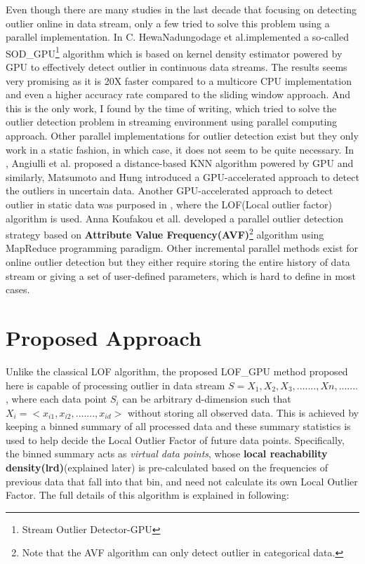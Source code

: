 \documentclass[11pt]{article}       %
\begin{document}
Even though there are many studies in the last decade that focusing on detecting outlier online in data stream, only a few tried to solve this problem using a parallel implementation. In \cite{7516110} C. HewaNadungodage et al.implemented a so-called SOD\_GPU\footnote{Stream Outlier Detector-GPU} algorithm which is based on kernel density estimator powered by GPU to effectively detect outlier in continuous data streams. The results seems very promising as it is 20X faster compared to a multicore CPU implementation and even a higher accuracy rate compared to the sliding window approach. And this is the only work, I found by the time of writing, which tried to solve the outlier detection problem in streaming environment using parallel computing approach. Other parallel implementations for outlier detection exist but they only work in a static fashion, in which case, it does not seem to be quite necessary. In \cite{6641405},  Angiulli et al. proposed a distance-based KNN algorithm powered by GPU and similarly, Matsumoto and Hung\cite{Matsumoto2012} introduced a GPU-accelerated approach to detect the outliers in uncertain data. Another GPU-accelerated approach to detect outlier in static data was purposed in \cite{Alshawabkeh:2010:ALO:1735688.1735707}, where the LOF(Local outlier factor) algorithm is used. Anna Koufakou et all.\cite{4634266} developed a parallel outlier detection strategy based on \textbf{Attribute Value Frequency(AVF)}\cite{4410382}\footnote{Note that the AVF algorithm can only detect outlier in categorical data.} algorithm using MapReduce programming paradigm. Other incremental parallel methods exist for online outlier detection but they either require storing the entire history of data stream or giving a set of user-defined parameters, which is hard to define in most cases. 

\section{Proposed Approach} \label{proapp}

Unlike the classical LOF algorithm, the proposed LOF\_GPU method proposed here is capable of processing outlier in data stream $S = {X_1, X_2, X_3, ......., Xn, .......}$, where each data point $S_i$ can be arbitrary d-dimension such that $X_i = <x_{i1}, x_{i2}, ......., x_{id}>$ without storing all observed data. This is achieved by keeping a binned summary of all processed data and these summary statistics is used to help decide the Local Outlier Factor of future data points. Specifically, the binned summary acts as \textit{virtual data points}, whose \textbf{local reachability density(lrd)}(explained later) is pre-calculated based on the frequencies of previous data that fall into that bin, and need not calculate its own Local Outlier Factor. The full details of this algorithm is explained in following:
\end{document}
